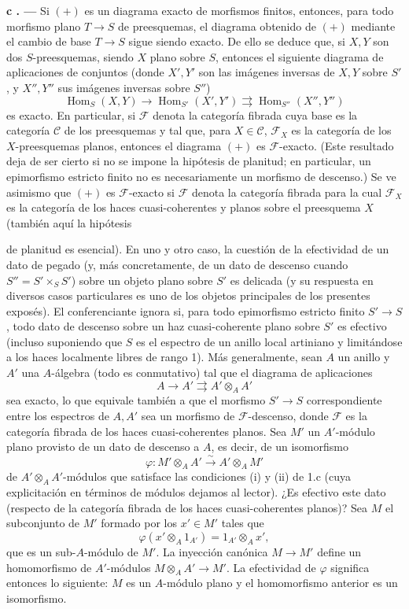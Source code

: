 \documentclass[11pt,twoside,openany]{book}
\numberwithin{equation}{section}
\newcommand{\src}[1]{%
  \phantomsection\hypertarget{src:#1}{}%
  \marginpar{\raggedleft\footnotesize\sffamily #1}%
}
\theoremstyle{plain}
\theoremstyle{definition}
\theoremstyle{remark}
\newcommand{\result}[2]{%
  \par\medskip\noindent\textbf{#1%
  \if\relax\detokenize{#2}\relax\else\space#2\fi. ---}\enspace
}
\newcommand{\FgaUnitKey}{frontmatter}
\renewcommand{\src}[1]{%
  \phantomsection\hypertarget{src:\FgaUnitKey:#1}{}%
  \marginpar{\raggedleft\footnotesize\sffamily #1}%
}
\theoremstyle{plain}
\theoremstyle{definition}
\theoremstyle{remark}
\begin{document}
\result{c}{} Si $(+)$ es un diagrama exacto de morfismos finitos, entonces,
para todo morfismo plano $T\longrightarrow S$ de preesquemas, el diagrama
obtenido de $(+)$ mediante el cambio de base $T\longrightarrow S$ sigue siendo
exacto. De ello se deduce que, si $X,Y$ son dos $S$-preesquemas, siendo $X$
plano sobre $S$, entonces el siguiente diagrama de aplicaciones de conjuntos
(donde $X',Y'$ son las imágenes inversas de $X,Y$ sobre $S'$, y $X'',Y''$ sus
imágenes inversas sobre $S''$)
\[
  \operatorname{Hom}_S(X,Y)\longrightarrow
  \operatorname{Hom}_{S'}(X',Y')
  \rightrightarrows
  \operatorname{Hom}_{S''}(X'',Y'')
\]
es exacto. En particular, si $\mathcal F$ denota la categoría fibrada cuya base
es la categoría $\mathcal C$ de los preesquemas y tal que, para
$X\in\mathcal C$, $\mathcal F_X$ es la categoría de los $X$-preesquemas
planos, entonces el diagrama $(+)$ es $\mathcal F$-exacto. (Este resultado deja
de ser cierto si no se impone la hipótesis de planitud; en particular, un
epimorfismo estricto finito no es necesariamente un morfismo de descenso.) Se
ve asimismo que $(+)$ es $\mathcal F$-exacto si $\mathcal F$ denota la
categoría fibrada para la cual $\mathcal F_X$ es la categoría de los haces
cuasi-coherentes y planos sobre el preesquema $X$ (también aquí la hipótesis

\src{307}
de planitud es esencial). En uno y otro caso, la cuestión de la efectividad de
un dato de pegado (y, más concretamente, de un dato de descenso cuando
$S''=S'\times_SS'$) sobre un objeto plano sobre $S'$ es delicada (y su
respuesta en diversos casos particulares es uno de los objetos principales de
los presentes exposés). El conferenciante ignora si, para todo epimorfismo
estricto finito $S'\longrightarrow S$, todo dato de descenso sobre un haz
cuasi-coherente plano sobre $S'$ es efectivo (incluso suponiendo que $S$ es el
espectro de un anillo local artiniano y limitándose a los haces localmente
libres de rango 1). Más generalmente, sean $A$ un anillo y $A'$ una
$A$-álgebra (todo es conmutativo) tal que el diagrama de aplicaciones
\[
  A\longrightarrow A'\rightrightarrows A'\otimes_AA'
\]
sea exacto, lo que equivale también a que el morfismo
$S'\longrightarrow S$ correspondiente entre los espectros de $A,A'$ sea un
morfismo de $\mathcal F$-descenso, donde $\mathcal F$ es la categoría fibrada
de los haces cuasi-coherentes planos. Sea $M'$ un $A'$-módulo plano provisto de
un dato de descenso a $A$, es decir, de un isomorfismo
\[
  \varphi:M'\otimes_AA'\xrightarrow{\sim}A'\otimes_AM'
\]
de $A'\otimes_AA'$-módulos que satisface las condiciones (i) y (ii) de 1.c
(cuya explicitación en términos de módulos dejamos al lector). ¿Es efectivo
este dato (respecto de la categoría fibrada de los haces cuasi-coherentes
planos)? Sea $M$ el subconjunto de $M'$ formado por los $x'\in M'$ tales que
\[
  \varphi(x'\otimes_A1_{A'})=1_{A'}\otimes_Ax',
\]
que es un sub-$A$-módulo de $M'$. La inyección canónica
$M\longrightarrow M'$ define un homomorfismo de $A'$-módulos
$M\otimes_AA'\longrightarrow M'$. La efectividad de $\varphi$ significa
entonces lo siguiente: $M$ es un $A$-módulo plano y el homomorfismo anterior es
un isomorfismo.
\end{document}
